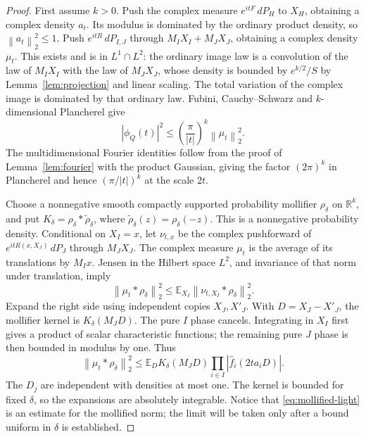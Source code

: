 \documentclass[11pt]{article}
\numberwithin{equation}{section}
\theoremstyle{definition}\newtheorem{definition}[theorem]{Definition}
\theoremstyle{remark}\newtheorem{remark}[theorem]{Remark}
\newcommand{\R}{\mathbb R}\newcommand{\E}{\mathbb E}\newcommand{\PP}{\mathbb P}
\newcommand{\1}{\mathbf 1}\newcommand{\diag}{\operatorname{diag}}
\newcommand{\norm}[1]{\left\lVert#1\right\rVert}\newcommand{\abs}[1]{\left|#1\right|}
\begin{document}
\begin{proof}
First assume $k>0$. Push the complex measure $e^{itF}\,dP_H$ to $X_H$, obtaining a complex density $a_t$. Its modulus is dominated by the ordinary product density, so $\norm{a_t}_2^2\le1$. Push $e^{itR}\,dP_{I,J}$ through $M_I X_I+M_J X_J$, obtaining a complex density $\mu_t$. This exists and is in $L^1\cap L^2$: the ordinary image law is a convolution of the law of $M_I X_I$ with the law of $M_J X_J$, whose density is bounded by $e^{k/2}/S$ by Lemma~\ref{lem:projection} and linear scaling. The total variation of the complex image is dominated by that ordinary law. Fubini, Cauchy--Schwarz and $k$-dimensional Plancherel give
\begin{equation}\label{eq:hub-cs}
 |\phi_Q(t)|^2\le\left(\frac\pi{|t|}\right)^k\norm{\mu_t}_2^2.
\end{equation}
The multidimensional Fourier identities follow from the proof of Lemma~\ref{lem:fourier} with the product Gaussian, giving the factor $(2\pi)^k$ in Plancherel and hence $(\pi/|t|)^k$ at the scale $2t$.

Choose a nonnegative smooth compactly supported probability mollifier $\rho_\delta$ on $\R^k$, and put $K_\delta=\rho_\delta*\widetilde\rho_\delta$, where $\widetilde\rho_\delta(z)=\rho_\delta(-z)$. This is a nonnegative probability density. Conditional on $X_I=x$, let $\nu_{t,x}$ be the complex pushforward of $e^{itR(x,X_J)}\,dP_J$ through $M_JX_J$. The complex measure $\mu_t$ is the average of its translations by $M_Ix$. Jensen in the Hilbert space $L^2$, and invariance of that norm under translation, imply
\[
 \norm{\mu_t*\rho_\delta}_2^2
 \le\E_{X_I}\norm{\nu_{t,X_I}*\rho_\delta}_2^2.
\]
Expand the right side using independent copies $X_J,X'_J$. With $D=X_J-X'_J$, the mollifier kernel is $K_\delta(M_JD)$. The pure $I$ phase cancels. Integrating in $X_I$ first gives a product of scalar characteristic functions; the remaining pure $J$ phase is then bounded in modulus by one. Thus
\begin{equation}\label{eq:mollified-light}
 \norm{\mu_t*\rho_\delta}_2^2
 \le\E_D K_\delta(M_JD)\prod_{i\in I}|\widehat f_i(2t a_iD)|.
\end{equation}
The $D_j$ are independent with densities at most one. The kernel is bounded for fixed $\delta$, so the expansions are absolutely integrable. Notice that \eqref{eq:mollified-light} is an estimate for the mollified norm; the limit will be taken only after a bound uniform in $\delta$ is established.


\end{proof}
\end{document}
